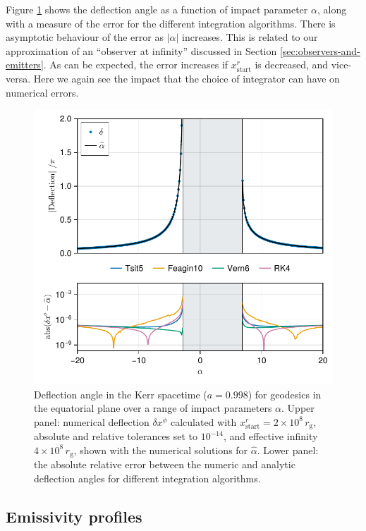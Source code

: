\documentclass[fleqn,usenatbib]{mnras}
\newcommand{\rg}{r_\text{g}}
\begin{document}
Figure \ref{fig:deflection-angle} shows the deflection angle as a function of
impact parameter $\alpha$, along with a  measure of the error for the different
integration algorithms. There is asymptotic behaviour of the error as $\lvert
\alpha \rvert$ increases. This is related to our approximation of an ``observer
at infinity'' discussed in Section \ref{sec:observers-and-emitters}. As can be
expected, the error increases if $x^r_\text{start}$ is decreased, and
vice-versa. Here we again see the impact that the choice of integrator can have
on numerical errors.

\begin{figure}
    \centering
    \includegraphics[width=0.94\linewidth]{figures/deflection.iyer-hansen.pdf}
    \caption{Deflection angle in the Kerr spacetime ($a = 0.998$) for geodesics in the equatorial plane over a range of impact parameters $\alpha$. Upper panel: numerical deflection $\delta x^\phi$ calculated with  $x^r_\text{start} = 2 \times 10^8 \, \rg$, absolute and relative tolerances set to $10^{-14}$, and effective infinity $4 \times 10^8\, \rg$, shown with the numerical solutions for $\hat{\alpha}$. Lower panel: the absolute relative error between the numeric and analytic deflection angles for different integration algorithms.}
    \label{fig:deflection-angle}
\end{figure}

\subsection{Emissivity profiles}
\end{document}
